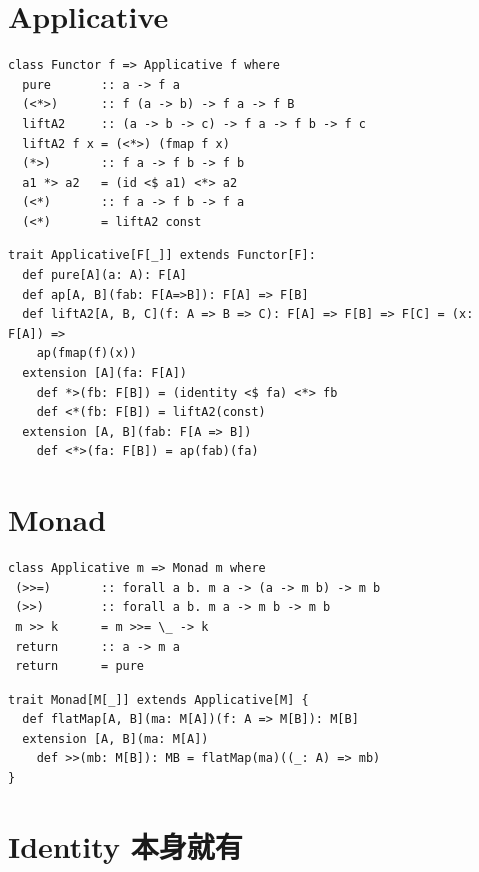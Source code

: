 \documentclass[letterspacing]{tufte-book}
\begin{document}
\chapter{Applicative}
\label{sec:orgd390c88}
\lstset{language=haskell,label= ,caption= ,captionpos=b,numbers=none}
\begin{lstlisting}
class Functor f => Applicative f where
  pure       :: a -> f a
  (<*>)      :: f (a -> b) -> f a -> f B
  liftA2     :: (a -> b -> c) -> f a -> f b -> f c
  liftA2 f x = (<*>) (fmap f x)
  (*>)       :: f a -> f b -> f b
  a1 *> a2   = (id <$ a1) <*> a2
  (<*)       :: f a -> f b -> f a
  (<*)       = liftA2 const
\end{lstlisting}

\lstset{language=scala,label= ,caption= ,captionpos=b,numbers=none}
\begin{lstlisting}
trait Applicative[F[_]] extends Functor[F]:
  def pure[A](a: A): F[A]
  def ap[A, B](fab: F[A=>B]): F[A] => F[B]
  def liftA2[A, B, C](f: A => B => C): F[A] => F[B] => F[C] = (x: F[A]) =>
    ap(fmap(f)(x))
  extension [A](fa: F[A])
    def *>(fb: F[B]) = (identity <$ fa) <*> fb
    def <*(fb: F[B]) = liftA2(const)
  extension [A, B](fab: F[A => B])
    def <*>(fa: F[B]) = ap(fab)(fa)
\end{lstlisting}

\chapter{Monad}
\label{sec:org3cf4122}
\lstset{language=haskell,label= ,caption= ,captionpos=b,numbers=none}
\begin{lstlisting}
class Applicative m => Monad m where
 (>>=)       :: forall a b. m a -> (a -> m b) -> m b
 (>>)        :: forall a b. m a -> m b -> m b
 m >> k      = m >>= \_ -> k
 return      :: a -> m a
 return      = pure
\end{lstlisting}

\lstset{language=scala,label= ,caption= ,captionpos=b,numbers=none}
\begin{lstlisting}
trait Monad[M[_]] extends Applicative[M] {
  def flatMap[A, B](ma: M[A])(f: A => M[B]): M[B]
  extension [A, B](ma: M[A])
    def >>(mb: M[B]): MB = flatMap(ma)((_: A) => mb)
}
\end{lstlisting}
\chapter{Identity 本身就有}
\label{sec:org4276978}
\end{document}
